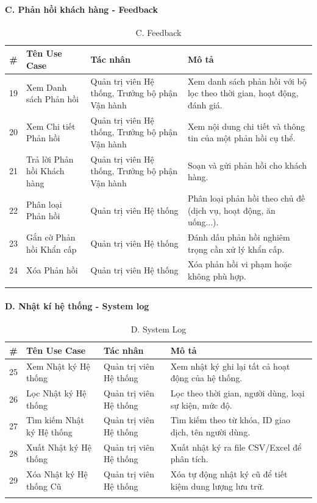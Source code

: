 \documentclass[12pt,a4paper]{article}
\begin{document}
	\paragraph{C. Phản hồi khách hàng - Feedback}
	\begin{longtable}{|c|p{4.5cm}|p{3.5cm}|p{4.5cm}|}
		\hline
		\textbf{\#} & \textbf{Tên Use Case} & \textbf{Tác nhân} & \textbf{Mô tả} \\
		\hline
		19 & Xem Danh sách Phản hồi & Quản trị viên Hệ thống, Trưởng bộ phận Vận hành & Xem danh sách phản hồi với bộ lọc theo thời gian, hoạt động, đánh giá. \\
		\hline
		20 & Xem Chi tiết Phản hồi & Quản trị viên Hệ thống, Trưởng bộ phận Vận hành & Xem nội dung chi tiết và thông tin của một phản hồi cụ thể. \\
		\hline
		21 & Trả lời Phản hồi Khách hàng & Quản trị viên Hệ thống, Trưởng bộ phận Vận hành & Soạn và gửi phản hồi cho khách hàng. \\
		\hline
		22 & Phân loại Phản hồi & Quản trị viên Hệ thống & Phân loại phản hồi theo chủ đề (dịch vụ, hoạt động, ăn uống...). \\
		\hline
		23 & Gắn cờ Phản hồi Khẩn cấp & Quản trị viên Hệ thống & Đánh dấu phản hồi nghiêm trọng cần xử lý khẩn cấp. \\
		\hline
		24 & Xóa Phản hồi & Quản trị viên Hệ thống & Xóa phản hồi vi phạm hoặc không phù hợp. \\
		\hline
		\caption*{C. Feedback}
	\end{longtable}
	
	\paragraph{D. Nhật kí hệ thống - System log}
	\begin{longtable}{|c|p{4.5cm}|p{3.5cm}|p{4.5cm}|}
		\hline
		\textbf{\#} & \textbf{Tên Use Case} & \textbf{Tác nhân} & \textbf{Mô tả} \\
		\hline
		25 & Xem Nhật ký Hệ thống & Quản trị viên Hệ thống & Xem nhật ký ghi lại tất cả hoạt động của hệ thống. \\
		\hline
		26 & Lọc Nhật ký Hệ thống & Quản trị viên Hệ thống & Lọc theo thời gian, người dùng, loại sự kiện, mức độ. \\
		\hline
		27 & Tìm kiếm Nhật ký Hệ thống & Quản trị viên Hệ thống & Tìm kiếm theo từ khóa, ID giao dịch, tên người dùng. \\
		\hline
		28 & Xuất Nhật ký Hệ thống & Quản trị viên Hệ thống & Xuất nhật ký ra file CSV/Excel để phân tích. \\
		\hline
		29 & Xóa Nhật ký Hệ thống Cũ & Quản trị viên Hệ thống & Xóa tự động nhật ký cũ để tiết kiệm dung lượng lưu trữ. \\
		\hline
		\caption*{D. System Log}
	\end{longtable}
	
\end{document}
